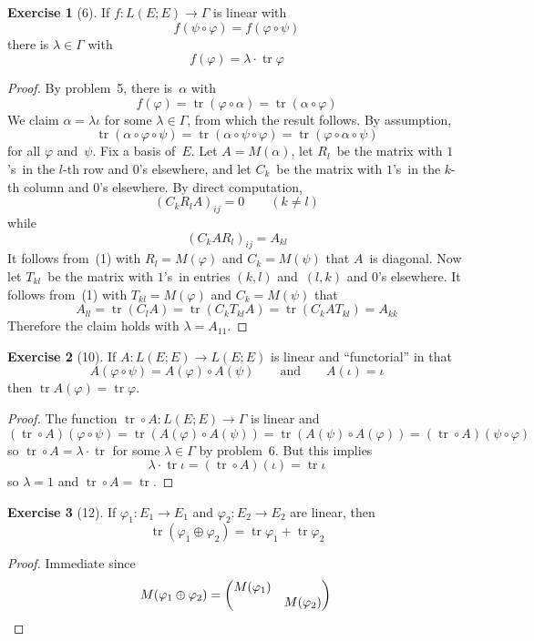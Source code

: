 \documentclass[letterpaper,12pt]{article}
\DeclareMathOperator{\tr}{tr}
\newcommand{\after}{\circ}
\newcommand{\dsum}{\oplus}
\newcommand{\mult}{\cdot}
\theoremstyle{definition}
\newtheorem*{exer}{Exercise}
\theoremstyle{remark}
\begin{document}
\begin{exer}[6]
If \(f:L(E;E)\to\Gamma\) is linear with
\[f(\psi\after\varphi)=f(\varphi\after\psi)\]
there is \(\lambda\in\Gamma\) with
\[f(\varphi)=\lambda\mult\tr\varphi\]
\end{exer}
\begin{proof}
By problem~5, there is~\(\alpha\) with
\[f(\varphi)=\tr(\varphi\after\alpha)=\tr(\alpha\after\varphi)\]
We claim \(\alpha=\lambda\iota\) for some \(\lambda\in\Gamma\), from which the result follows. By assumption,
\[\tr(\alpha\after\varphi\after\psi)=\tr(\alpha\after\psi\after\varphi)=\tr(\varphi\after\alpha\after\psi)\tag{1}\]
for all \(\varphi\) and~\(\psi\). Fix a basis of~\(E\). Let \(A=M(\alpha)\), let \(R_l\)~be the matrix with \(1\)'s~in the \(l\)-th row and \(0\)'s elsewhere, and let \(C_k\)~be the matrix with \(1\)'s~in the \(k\)-th column and \(0\)'s elsewhere. By direct computation,
\[(C_kR_lA)_{ij}=0\qquad(k\ne l)\]
while
\[(C_kAR_l)_{ij}=A_{kl}\]
It follows from~(1) with \(R_l=M(\varphi)\) and \(C_k=M(\psi)\) that \(A\)~is diagonal. Now let \(T_{kl}\)~be the matrix with \(1\)'s~in entries \((k,l)\) and~\((l,k)\) and \(0\)'s elsewhere. It follows from~(1) with \(T_{kl}=M(\varphi)\) and \(C_k=M(\psi)\) that
\[A_{ll}=\tr(C_lA)=\tr(C_kT_{kl}A)=\tr(C_kAT_{kl})=A_{kk}\]
Therefore the claim holds with \(\lambda=A_{11}\).
\end{proof}

\begin{exer}[10]
If \(A:L(E;E)\to L(E;E)\) is linear and ``functorial'' in that
\[A(\varphi\after\psi)=A(\varphi)\after A(\psi)\qquad\text{and}\qquad A(\iota)=\iota\]
then \(\tr A(\varphi)=\tr\varphi\).
\end{exer}
\begin{proof}
The function \(\tr\after A:L(E;E)\to\Gamma\) is linear and
\[(\tr\after A)(\varphi\after\psi)=\tr(A(\varphi)\after A(\psi))=\tr(A(\psi)\after A(\varphi))=(\tr\after A)(\psi\after\varphi)\]
so \(\tr\after A=\lambda\mult\tr\) for some \(\lambda\in\Gamma\) by problem~6. But this implies
\[\lambda\mult\tr\iota=(\tr\after A)(\iota)=\tr\iota\]
so \(\lambda=1\) and \(\tr\after A=\tr\).
\end{proof}

\begin{exer}[12]
If \(\varphi_1:E_1\to E_1\) and \(\varphi_2:E_2\to E_2\) are linear, then
\[\tr(\varphi_1\dsum\varphi_2)=\tr\varphi_1+\tr\varphi_2\]
\end{exer}
\begin{proof}
Immediate since
\[M(\varphi_1\dsum\varphi_2)=\begin{pmatrix}
M(\varphi_1)&\\
&M(\varphi_2)
\end{pmatrix}\qedhere\]
\end{proof}
\end{document}
